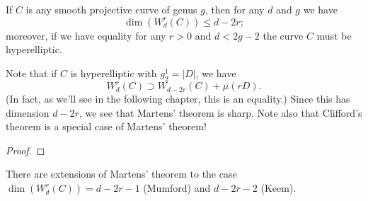 \begin{theorem}
If $C$ is any smooth projective curve of genus $g$, then for any $d$ and $g$ we have
$$
\dim(W^r_d(C)) \leq d-2r;
$$
moreover, if we have equality for any $r > 0$ and $d < 2g-2$ the curve $C$ must be hyperelliptic.
\end{theorem}

Note that if $C$ is hyperelliptic with $g^1_2 = |D|$, we have
$$
W^r_d(C) \supset W_{d-2r}(C) + \mu(rD).
$$
(In fact, as we'll see in the following chapter, this is an equality.) Since this has dimension $d-2r$, we see that Martens' theorem is sharp. Note also that Clifford's theorem is a special case of Martens' theorem!

\begin{proof}

\end{proof}

There are extensions of Martens' theorem to the case $\dim(W^r_d(C)) = d-2r-1$ (Mumford) and $d-2r-2$ (Keem).

